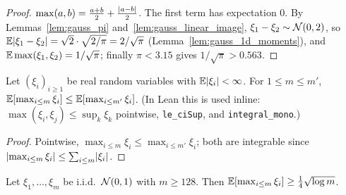 \begin{proof}
\leanok
{}
$\max(a,b) = \frac{a+b}{2} + \frac{\lvert a-b \rvert}{2}$. The first term has expectation $0$. By
Lemmas~\ref{lem:gauss_pi} and~\ref{lem:gauss_linear_image}, $\xi_1-\xi_2\sim\mathcal{N}(0,2)$, so
$\mathbb{E}\lvert \xi_1-\xi_2 \rvert = \sqrt2\cdot\sqrt{2/\pi} = 2/\sqrt\pi$ (Lemma~\ref{lem:gauss_1d_moments}),
and $\mathbb{E}\max(\xi_1,\xi_2) = 1/\sqrt\pi$; finally $\pi < 3.15$ gives $1/\sqrt\pi > 0.563$.
\end{proof}

\begin{lemma}\label{lem:psf_max_mono}
\leanok
Let $(\xi_i)_{i\ge1}$ be real random variables with $\mathbb{E}\lvert \xi_i \rvert<\infty$. For $1\le m\le m'$,
$\mathbb{E}[\max_{i\le m}\xi_i] \le \mathbb{E}[\max_{i\le m'}\xi_i]$.
(In Lean this is used inline: $\max(\xi_i,\xi_j) \le \sup_k\xi_k$ pointwise, \texttt{le\_ciSup},
and \texttt{integral\_mono}.)
\end{lemma}

\begin{proof}
\leanok
Pointwise, $\max_{i\le m}\xi_i\le\max_{i\le m'}\xi_i$; both are integrable since
$\lvert \max_{i\le m}\xi_i \rvert\le\sum_{i\le m}\lvert \xi_i \rvert$.
\end{proof}

\begin{lemma}\label{lem:psf_max_lower_large}
\leanok
{}
Let $\xi_1,\dots,\xi_m$ be i.i.d.\ $\mathcal{N}(0,1)$ with $m \ge 128$. Then
$\mathbb{E}[\max_{i\le m}\xi_i] \ge \frac14\sqrt{\log m}$.
\end{lemma}

